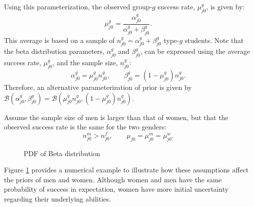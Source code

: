 \documentclass[11 pt]{article}
\newcommand{\pr}[1]{\left( #1 \right)}
\begin{document}
Using this parameterization, the observed group-$g$ success rate, $\mu_{j0}^g$, is given by:
\begin{equation*}
\mu_{j0}^g = 
  \frac{\alpha_{j0}^g}{\alpha_{j0}^g + \beta_{j0}^g}.
\end{equation*}
This average is based on a sample of $n_{j0}^g = \alpha_{j0}^g + \beta_{j0}^g$ type-$g$ students.
Note that the beta distribution parameters, $\alpha_{j0}^g$ and $\beta_{j0}^g$, can be expressed using the average success rate, $\mu_{j0}^g$, and the sample size, $n_{j0}^g$:
\begin{equation*}
     \alpha_{j0}^g = \mu_{j0}^g n_{j0}^g,
     \quad \quad \beta_{j0}^g = (1 - \mu_{j0}^g) n_{j0}^g.
 \end{equation*}
 Therefore, an alternative parameterization of prior is given by $\mathcal{B} \pr{\alpha_{j0}^g, \beta_{j0}^g} = \mathcal{B} \pr{\mu_{j0}^g n_{j0}^g, (1 - \mu_{j0}^g) n_{j0}^g}$.
 
Assume the sample size of men is larger than that of women, but that the observed success rate is the same for the two genders:
\begin{equation*}
  n_{j0}^m > n_{j0}^f, \quad \quad \mu_{j0} = \mu_{j0}^m = \mu_{j0}^w.
\end{equation*}
\begin{figure}
\centering

\caption{PDF of Beta distribution}
\label{beta_distribution}
\end{figure}
Figure \ref{beta_distribution} provides a numerical example to illustrate how these assumptions affect the priors of men and women. 
Although women and men have the same probability of success in expectation, women have more initial uncertainty regarding their underlying abilities. 
\end{document}
